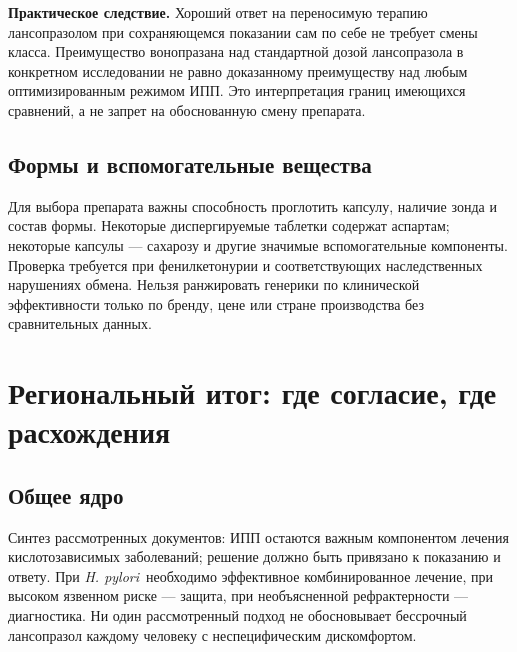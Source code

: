 \documentclass[11pt,a4paper,notitlepage]{report}
\newcommand{\Hp}{\textit{H. pylori}}
\newcommand{\src}[1]{\unskip\space\cite{#1}}
\begin{document}
\textbf{Практическое следствие.} Хороший ответ на переносимую терапию лансопразолом при сохраняющемся показании сам по себе не требует смены класса. Преимущество вонопразана над стандартной дозой лансопразола в конкретном исследовании не равно доказанному преимуществу над любым оптимизированным режимом ИПП. Это интерпретация границ имеющихся сравнений, а не запрет на обоснованную смену препарата.\src{agapcab,vontrial}

\subsection{Формы и вспомогательные вещества}
Для выбора препарата важны способность проглотить капсулу, наличие зонда и состав формы. Некоторые диспергируемые таблетки содержат аспартам; некоторые капсулы --- сахарозу и другие значимые вспомогательные компоненты. Проверка требуется при фенилкетонурии и соответствующих наследственных нарушениях обмена. Нельзя ранжировать генерики по клинической эффективности только по бренду, цене или стране производства без сравнительных данных.\src{emc,hpra}

\section{Региональный итог: где согласие, где расхождения}

\subsection{Общее ядро}
Синтез рассмотренных документов: ИПП остаются важным компонентом лечения кислотозависимых заболеваний; решение должно быть привязано к показанию и ответу. При \Hp\ необходимо эффективное комбинированное лечение, при высоком язвенном риске --- защита, при необъясненной рефрактерности --- диагностика. Ни один рассмотренный подход не обосновывает бессрочный лансопразол каждому человеку с неспецифическим дискомфортом.\src{agagerd,dgvs,seoul,rfgerd}
\end{document}
